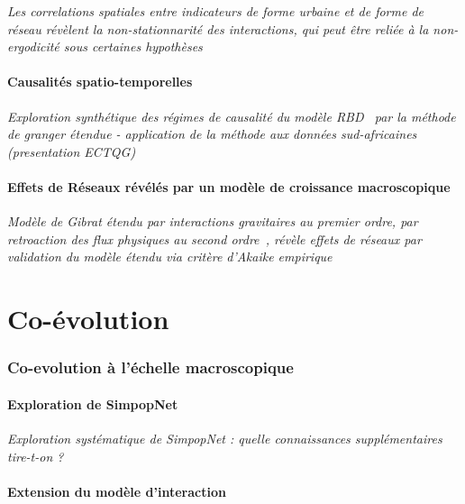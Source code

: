 \textit{Les correlations spatiales entre indicateurs de forme urbaine et de forme de réseau révèlent la non-stationnarité des interactions, qui peut être reliée à la non-ergodicité sous certaines hypothèses~\cite{raimbault2016cautious}}


\subsection{Causalités spatio-temporelles}


\textit{Exploration synthétique des régimes de causalité du modèle RBD~\cite{raimbault2014hybrid} par la méthode de granger étendue - application de la méthode aux données sud-africaines (presentation ECTQG)}


\subsection{Effets de Réseaux révélés par un modèle de croissance macroscopique}

\textit{Modèle de Gibrat étendu par interactions gravitaires au premier ordre, par retroaction des flux physiques au second ordre~\cite{raimbault2016models}, révèle effets de réseaux par validation du modèle étendu via critère d'Akaike empirique} 




\part{Co-évolution}

\section{Co-evolution à l'échelle macroscopique}

\subsection{Exploration de SimpopNet}

\textit{Exploration systématique de SimpopNet : quelle connaissances supplémentaires tire-t-on ?}

\subsection{Extension du modèle d'interaction}


